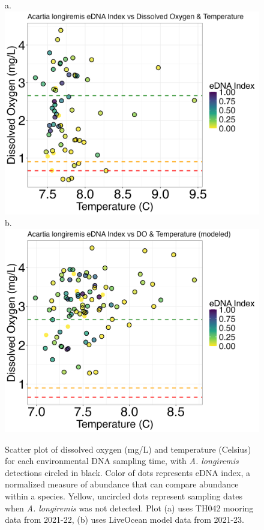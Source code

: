 \documentclass[12pt,twoside]{reedthesis}
\begin{document}
	\begin{figure}[!h]
		\begin{center}
			a. \includegraphics[scale=0.3]{Alongiremis_Scatter_noOut}
			b. \includegraphics[scale=0.3]{Alongiremis_Scatter_AllYr_mod_noOut}
			\caption[\textit{A. longiremis} scatterplot]{\footnotesize{Scatter plot of dissolved oxygen (mg/L) and temperature (Celsius) for each environmental DNA sampling time, with \textit{A. longiremis} detections circled in black. Color of dots represents eDNA index, a normalized measure of abundance that can compare abundance within a species. Yellow, uncircled dots represent sampling dates when \textit{A. longiremis} was not detected. Plot (a) uses TH042 mooring data from 2021-22, (b) uses LiveOcean model data from 2021-23.}} %
			\label{AlongiremisScatter}
		\end{center}
	\end{figure} 
	
\end{document}
